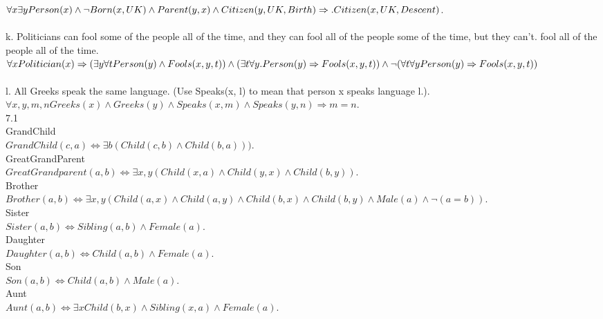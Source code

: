 \documentclass[a4paper]{article}
\begin{document}
\begin{enumerate}[1.]
$\forall x\exists y Person(x)\wedge \neg Born(x,UK) \wedge Parent(y, x) \wedge Citizen(y,UK,Birth) \Rightarrow.\\ Citizen(x,UK,Descent)$.\\
\\
k. Politicians can fool some of the people all of the time, and they can fool all of the people some of the time, but they can't. fool all of the people all of the time.
$ \forall  x Politician(x) \Rightarrow (\exists y \forall t Person(y) \wedge  Fools(x, y, t)) \wedge  (\exists t \forall y.\\ Person(y) \Rightarrow Fools(x, y, t)) \wedge \neg(\forall  t \forall y Person(y) \Rightarrow Fools(x, y, t))$\\
\\
l. All Greeks speak the same language. (Use Speaks(x, l) to mean that person x speaks language l.).\\
$\forall  x, y, m, n Greeks(x)\wedge Greeks(y)\wedge Speaks(x, m)\wedge Speaks(y, n) \Rightarrow m=n$.\\

7.1\\
GrandChild\\
$GrandChild(c, a) \Leftrightarrow \exists b(Child(c, b) \wedge Child(b, a)))$.\\

GreatGrandParent\\
$GreatGrandparent(a, b) \Leftrightarrow \exists x, y(Child(x, a) \wedge Child(y, x) \wedge Child(b, y))$.\\

Brother\\
$Brother(a, b) \Leftrightarrow \exists x, y(Child(a, x) \wedge Child(a, y) \wedge Child(b, x) \wedge Child(b, y) \wedge Male(a) \wedge \neg (a = b))$.\\

Sister\\
$Sister(a,b) \Leftrightarrow Sibling(a,b) \wedge Female(a)$.\\

Daughter\\
$Daughter(a,b) \Leftrightarrow Child(a, b) \wedge Female(a)$.\\

Son\\
$Son(a,b) \Leftrightarrow Child(a, b) \wedge Male(a)$.\\

Aunt\\
$Aunt(a,b) \Leftrightarrow \exists x Child(b, x) \wedge Sibling(x,a) \wedge Female(a)$.\\


\end{enumerate}
\end{document}
